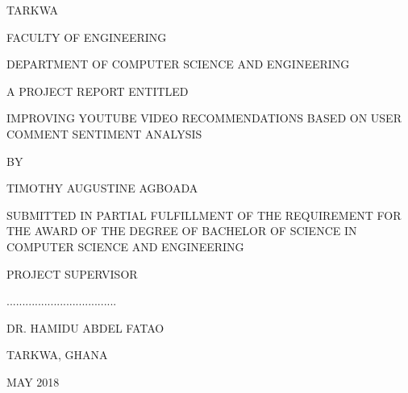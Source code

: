 
\begin{coverpage}
	\vspace{-3.0cm}

	
	TARKWA 
	\vspace{1.0cm}
	
	FACULTY OF ENGINEERING 
	
	DEPARTMENT OF COMPUTER SCIENCE AND ENGINEERING 
	\vspace{1.5cm}
	
	A PROJECT REPORT ENTITLED 
	
	IMPROVING YOUTUBE VIDEO RECOMMENDATIONS BASED ON USER COMMENT SENTIMENT ANALYSIS
	\vspace{1.0cm}
	
	BY
	 
	TIMOTHY AUGUSTINE AGBOADA
	\vspace{1.5cm}
	
	SUBMITTED IN PARTIAL FULFILLMENT OF THE REQUIREMENT FOR THE
	AWARD OF THE DEGREE OF BACHELOR OF SCIENCE IN COMPUTER SCIENCE AND ENGINEERING 
	
	\vspace{1.5cm}
	PROJECT SUPERVISOR
	\vspace{1.0cm}
	  
	...................................
	
	DR. HAMIDU ABDEL FATAO

	\vspace{1.0cm}

	TARKWA, GHANA
	
	MAY 2018
	
\end{coverpage}	

